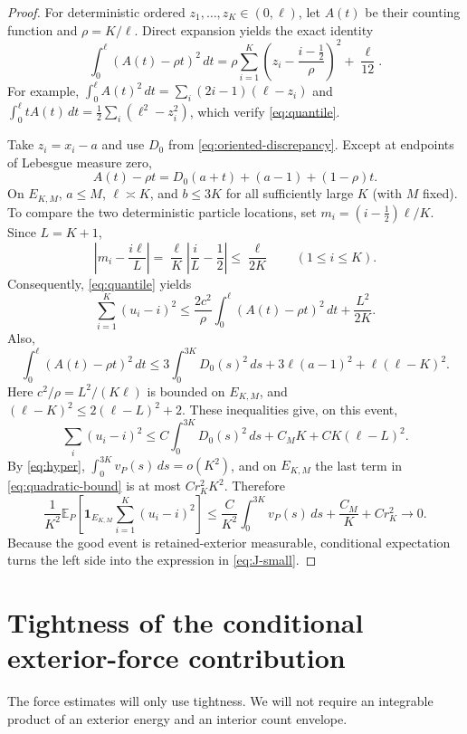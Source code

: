 \documentclass[11pt,reqno]{amsart}
\numberwithin{equation}{section}
\theoremstyle{definition}
\theoremstyle{remark}
\newcommand{\E}{\mathbb E}
\newcommand{\1}{\mathbf 1}
\newcommand{\dd}{\,d}
\begin{document}
\begin{proof}
For deterministic ordered $z_1,\ldots,z_K\in(0,\ell)$, let $A(t)$ be
their counting function and $\rho=K/\ell$. Direct expansion yields the
exact identity
\begin{equation}\label{eq:quantile}
\int_0^\ell(A(t)-\rho t)^2\dd t
=\rho\sum_{i=1}^K
\left(z_i-\frac{i-\frac12}{\rho}\right)^2+\frac{\ell}{12}.
\end{equation}
For example,
$\int_0^\ell A(t)^2\dd t=\sum_i(2i-1)(\ell-z_i)$ and
$\int_0^\ell tA(t)\dd t=\frac12\sum_i(\ell^2-z_i^2)$, which verify
\eqref{eq:quantile}.

Take $z_i=x_i-a$ and use $D_0$ from \eqref{eq:oriented-discrepancy}. Except at endpoints of
Lebesgue measure zero,
\[
A(t)-\rho t=D_0(a+t)+(a-1)+(1-\rho)t.
\]
On $E_{K,M}$, $a\le M$, $\ell\asymp K$, and $b\le3K$ for all
sufficiently large $K$ (with $M$ fixed). To compare the two deterministic particle locations, set
$m_i=(i-\frac12)\ell/K$. Since $L=K+1$,
\[
\left|m_i-\frac{i\ell}{L}\right|
 =\frac\ell K\left|\frac iL-\frac12\right|
 \le\frac\ell{2K}\qquad(1\le i\le K).
\]
Consequently, \eqref{eq:quantile} yields
\[
\sum_{i=1}^K(u_i-i)^2
\le\frac{2c^2}{\rho}\int_0^\ell(A(t)-\rho t)^2\dd t
   +\frac{L^2}{2K}.
\]
Also,
\[
\int_0^\ell(A(t)-\rho t)^2\dd t
\le3\int_0^{3K}D_0(s)^2\dd s
  +3\ell(a-1)^2+\ell(\ell-K)^2.
\]
Here $c^2/\rho=L^2/(K\ell)$ is bounded on $E_{K,M}$, and
$(\ell-K)^2\le2(\ell-L)^2+2$. These inequalities give, on this event,
\begin{equation}\label{eq:quadratic-bound}
\sum_i(u_i-i)^2
\le C\int_0^{3K}D_0(s)^2\dd s+C_MK+CK(\ell-L)^2.
\end{equation}
By \eqref{eq:hyper},
$\int_0^{3K}v_P(s)\dd s=o(K^2)$, and on $E_{K,M}$ the last term
in \eqref{eq:quadratic-bound} is at most $Cr_K^2K^2$. Therefore
\[
\frac1{K^2}\E_P\!\left[\1_{E_{K,M}}
     \sum_{i=1}^K(u_i-i)^2\right]
\le\frac C{K^2}\int_0^{3K}v_P(s)\dd s+\frac{C_M}{K}+Cr_K^2
\longrightarrow0.
\]
Because the good event is retained-exterior measurable, conditional
expectation turns the left side into the expression in
\eqref{eq:J-small}.
\end{proof}

\section{Tightness of the conditional exterior-force contribution}\label{sec:forces}

The force estimates will only use tightness. We will not require an
integrable product of an exterior energy and an interior count envelope.
\end{document}
